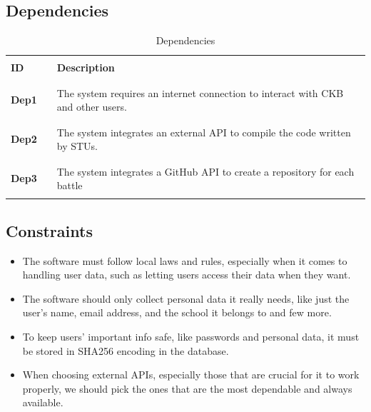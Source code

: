 \subsection{Dependencies}
\begin{table}[H]
    \centering
    \renewcommand{\arraystretch}{0.5}
    \begin{tabular}{l l p{10.5cm}}
        \hline
                      &        &                                                                                  \\
        \textbf{ID}   & \vline & \textbf{Description}                                                             \\
                      &        &                                                                                  \\\hline & & \\
        \textbf{Dep1} & \vline & The system requires an internet connection to interact with CKB and other users. \\
                      &        &                                                                                  \\\hline & & \\
        \textbf{Dep2} & \vline & The system integrates an external API to compile the code written by STUs.       \\
                      &        &                                                                                  \\\hline & & \\
        \textbf{Dep3} & \vline & The system integrates a GitHub API to create a repository for each battle        \\
                      &        &                                                                                  \\
        \hline
    \end{tabular}
    \caption{Dependencies}
\end{table}

\subsection{Constraints}
\begin{itemize}
    \item The software must follow local laws and rules, especially when it comes to handling user data, such as letting users access their data when they want.
    \item The software should only collect personal data it really needs, like just the user's name, email address, and the school it belongs to and few more.
    \item To keep users' important info safe, like passwords and personal data, it must be stored in SHA256 encoding in the database.
    \item When choosing external APIs, especially those that are crucial for it to work properly, we should pick the ones that are the most dependable and always available.
\end{itemize}